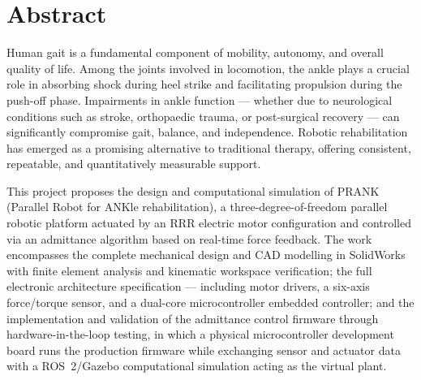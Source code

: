 
\section*{Abstract}
{}
\graphicspath{{images/}}

Human gait is a fundamental component of mobility, autonomy, and overall quality of life. Among the joints involved in locomotion, the ankle plays a crucial role in absorbing shock during heel strike and facilitating propulsion during the push-off phase. Impairments in ankle function — whether due to neurological conditions such as stroke, orthopaedic trauma, or post-surgical recovery — can significantly compromise gait, balance, and independence. Robotic rehabilitation has emerged as a promising alternative to traditional therapy, offering consistent, repeatable, and quantitatively measurable support.

This project proposes the design and computational simulation of PRANK (Parallel Robot for ANKle rehabilitation), a three-degree-of-freedom parallel robotic platform actuated by an RRR electric motor configuration and controlled via an admittance algorithm based on real-time force feedback. The work encompasses the complete mechanical design and CAD modelling in SolidWorks with finite element analysis and kinematic workspace verification; the full electronic architecture specification — including motor drivers, a six-axis force/torque sensor, and a dual-core microcontroller embedded controller; and the implementation and validation of the admittance control firmware through hardware-in-the-loop testing, in which a physical microcontroller development board runs the production firmware while exchanging sensor and actuator data with a ROS~2/Gazebo computational simulation acting as the virtual plant.

